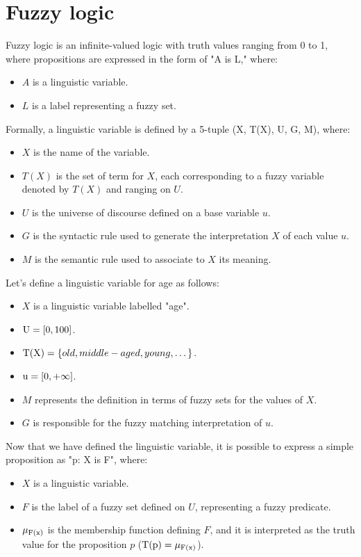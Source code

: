 \section{Fuzzy logic}

Fuzzy logic is an infinite-valued logic with truth values ranging from 0 to 1, where propositions are expressed in the form of "A is L," where:
\begin{itemize}
    \item $A$ is a linguistic variable.
    \item $L$ is a label representing a fuzzy set.
\end{itemize}
Formally, a linguistic variable is defined by a 5-tuple (X, T(X), U, G, M), where: 
\begin{itemize}
    \item $X$ is the name of the variable.
    \item $T(X)$ is the set of term for $X$, each corresponding to a fuzzy variable denoted by $T(X)$ and ranging on $U$.
    \item $U$ is the universe of discourse defined on a base variable $u$.
    \item $G$ is the syntactic rule used to generate the interpretation $X$ of each value $u$.
    \item $M$ is the semantic rule used to associate to $X$ its meaning.
\end{itemize}
\begin{example}
    Let's define a linguistic variable for age as follows:
    \begin{itemize}
        \item $X$ is a linguistic variable labelled "age".
        \item $\textnormal{U}=[0,100]$.
        \item $\textnormal{T(X)}=\{old, middle-aged, young, \dots\}$.
        \item $\textnormal{u}=[0,+\infty]$.
        \item $M$ represents the definition in terms of fuzzy sets for the values of $X$.
        \item $G$ is responsible for the fuzzy matching interpretation of $u$.
    \end{itemize}
\end{example}
Now that we have defined the linguistic variable, it is possible to express a simple proposition as "p: X is F", where:
\begin{itemize}
    \item $X$ is a linguistic variable.
    \item $F$ is the label of a fuzzy set defined on $U$, representing a fuzzy predicate.
    \item $\mu_{\textnormal{F(x)}}$ is the membership function defining $F$, and it is interpreted as the truth value for the proposition $p$ ($\textnormal{T(p)}=\mu_{\textnormal{F(x)}}$).
\end{itemize}
